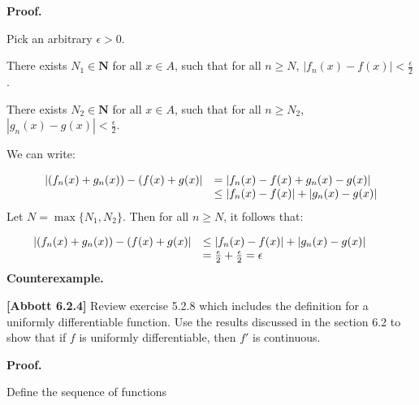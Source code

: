 \documentclass[10pt]{article}
\begin{document}
\textbf{Proof.}



Pick an arbitrary $\displaystyle \epsilon  >0$.



There exists $\displaystyle N_{1} \in \mathbf{N}$ for all $\displaystyle x\in A$, such that for all $\displaystyle n\geq N$, $\displaystyle |f_{n}( x) -f( x) |< \frac{\epsilon }{2}$.



There exists $\displaystyle N_{2} \in \mathbf{N}$ for all $\displaystyle x\in A$, such that for all $\displaystyle n\geq N_{2}$, $\displaystyle |g_{n}( x) -g( x) |< \frac{\epsilon }{2}$.



We can write:




\begin{equation*}
\begin{array}{ c l }
|( f_{n}( x) +g_{n}( x)) -( f( x) +g( x) | & =|f_{n}( x) -f( x) +g_{n}( x) -g( x) |\\
 & \leq |f_{n}( x) -f( x) |+|g_{n}( x) -g( x) |
\end{array}
\end{equation*}
Let $\displaystyle N=\max\{N_{1} ,N_{2}\}$. Then for all $\displaystyle n\geq N$, it follows that:


\begin{equation*}
\begin{array}{ c l }
|( f_{n}( x) +g_{n}( x)) -( f( x) +g( x) | & \leq |f_{n}( x) -f( x) |+|g_{n}( x) -g( x) |\\
 & =\frac{\epsilon }{2} +\frac{\epsilon }{2} =\epsilon 
\end{array}\begin{array}{ c c }
 & \\
 & 
\end{array}
\end{equation*}
\textbf{Counterexample.}





\textbf{[Abbott 6.2.4]} Review exercise 5.2.8 which includes the definition for a uniformly differentiable function. Use the results discussed in the section 6.2 to show that if $\displaystyle f$ is uniformly differentiable, then $\displaystyle f'$ is continuous.



\textbf{Proof.}



Define the sequence of functions
\end{document}
